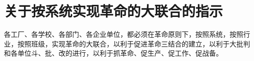 \section[关于按系统实现革命的大联合的指示（一九六七年十月十七日）]{关于按系统实现革命的大联合的指示}


各工厂、各学校、各部门、各企业单位，都必须在革命原则下，按照系统，按照行业，按照班级，实现革命的大联合，以利于促进革命三结合的建立，以利于大批判和各单位斗、批、改的进行，以利于抓革命、促生产、促工作、促战备。


